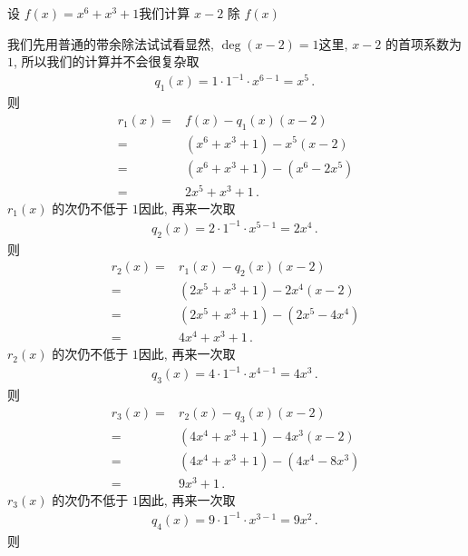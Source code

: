 \begin{example}
    设 $f(x) = x^6 + x^3 + 1$\period 我们计算 $x - 2$ 除 $f(x)$\period

    我们先用普通的带余除法试试看\period 显然, $\deg (x-2) = 1$\period 这里, $x - 2$ 的首项系数为 $1$, 所以我们的计算并不会很复杂\period 取
    \begin{align*}
        q_1 (x) = 1 \cdot 1^{-1} \cdot x^{6-1} = x^5 \period
    \end{align*}
    则
    \begin{align*}
        r_1 (x)
        = {} & f(x) - q_1 (x) (x - 2)         \\
        = {} & (x^6 + x^3 + 1) - x^5 (x - 2)  \\
        = {} & (x^6 + x^3 + 1) - (x^6 - 2x^5) \\
        = {} & 2x^5 + x^3 + 1 \period
    \end{align*}
    $r_1 (x)$ 的次仍不低于 $1$\period 因此, 再来一次\period 取
    \begin{align*}
        q_2 (x) = 2 \cdot 1^{-1} \cdot x^{5-1} = 2x^4 \period
    \end{align*}
    则
    \begin{align*}
        r_2 (x)
        = {} & r_1 (x) - q_2 (x) (x - 2)        \\
        = {} & (2x^5 + x^3 + 1) - 2x^4 (x - 2)  \\
        = {} & (2x^5 + x^3 + 1) - (2x^5 - 4x^4) \\
        = {} & 4x^4 + x^3 + 1 \period
    \end{align*}
    $r_2 (x)$ 的次仍不低于 $1$\period 因此, 再来一次\period 取
    \begin{align*}
        q_3 (x) = 4 \cdot 1^{-1} \cdot x^{4-1} = 4x^3 \period
    \end{align*}
    则
    \begin{align*}
        r_3 (x)
        = {} & r_2 (x) - q_3 (x) (x - 2)        \\
        = {} & (4x^4 + x^3 + 1) - 4x^3 (x - 2)  \\
        = {} & (4x^4 + x^3 + 1) - (4x^4 - 8x^3) \\
        = {} & 9x^3 + 1 \period
    \end{align*}
    $r_3 (x)$ 的次仍不低于 $1$\period 因此, 再来一次\period 取
    \begin{align*}
        q_4 (x) = 9 \cdot 1^{-1} \cdot x^{3-1} = 9x^2 \period
    \end{align*}
    则
    \begin{align*}

\end{align*}
\end{example}
